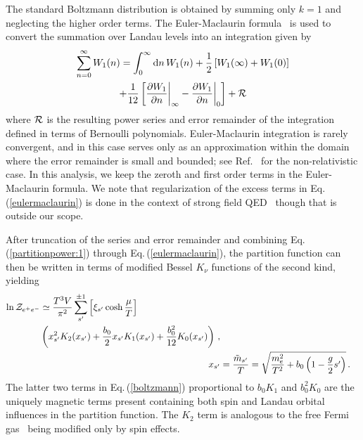 \documentclass[aps,prd,floatfix,reprint]{revtex4-2}
\newcommand{\req}[1]{Eq.\,(\ref{#1})}
\begin{document}
The standard Boltzmann distribution is obtained by summing only $k=1$ and neglecting the higher order terms. The Euler-Maclaurin formula~\cite{abramowitz1988handbook} is used to convert the summation over Landau levels into an integration given by
\begin{multline}
 \label{eulermaclaurin}
 \sum_{n=0}^{\infty}W_{1}(n)=\int_{0}^{\infty}{\rm d}n\,W_{1}(n)+\frac{1}{2}\left[W_{1}(\infty)+W_{1}(0)\right]\\
 +\frac{1}{12}\left[\frac{\partial W_{1}}{\partial n}\bigg\vert_{\infty}-\frac{\partial W_{1}}{\partial n}\bigg\vert_{0}\right]+{\cal R}
\end{multline}
where ${\cal R}$ is the resulting power series and error remainder of the integration defined in terms of Bernoulli polynomials. Euler-Maclaurin integration is rarely convergent, and in this case serves only as an approximation within the domain where the error remainder is small and bounded; see Ref.~\cite{greiner2012thermodynamics} for the non-relativistic case. In this analysis, we keep the zeroth and first order terms in the Euler-Maclaurin formula. We note that regularization of the excess terms in \req{eulermaclaurin} is done in the context of strong field QED~\cite{greiner2008quantum} though that is outside our scope.

After truncation of the series and error remainder and combining \req{partitionpower:1} through \req{eulermaclaurin}, the partition function can then be written in terms of modified Bessel $K_{\nu}$ functions of the second kind, yielding
\begin{align}
    \begin{split}
        \label{boltzmann}
        \ln{\cal Z}_{e^{+}e^{-}}&\simeq\frac{T^{3}V}{\pi^{2}}\sum_{s'}^{\pm1}\left[\xi_{s'}\cosh{\frac{\mu}{T}}\right]\\
        &\left(x_{s'}^{2}K_{2}(x_{s'})+\frac{b_{0}}{2}x_{s'}K_{1}(x_{s'})+\frac{b_{0}^{2}}{12}K_{0}(x_{s'})\right)\,,
    \end{split}\\
    \label{xfunc}
    x_{s'}&=\frac{{\tilde m}_{s'}}{T}=\sqrt{\frac{m_{e}^{2}}{T^{2}}+b_{0}\left(1-\frac{g}{2}s'\right)}\,.
\end{align}
The latter two terms in \req{boltzmann} proportional to $b_{0}K_{1}$ and $b_{0}^{2}K_{0}$ are the uniquely magnetic terms present containing both spin and Landau orbital influences in the partition function. The $K_{2}$ term is analogous to the free Fermi gas~\cite{greiner2012thermodynamics} being modified only by spin effects.
\end{document}
